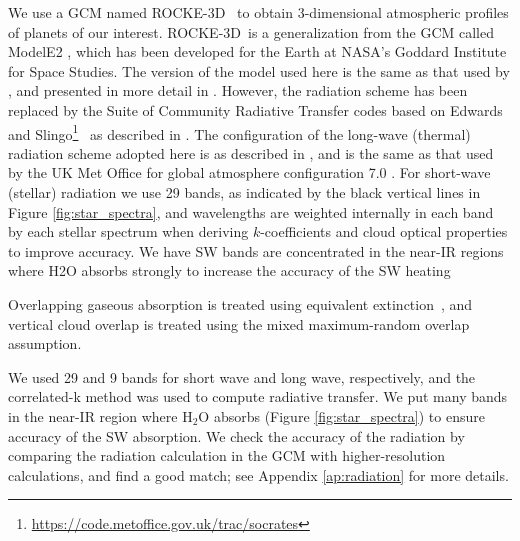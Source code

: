 \documentclass[11pt,numberedappendix,twocolappendix,]{emulateapj}
\def\water{H$_2$O }
\def\modelE{ROCKE-3D}
\begin{document}
We use a GCM named \modelE \ \citep{Way2017} to obtain 3-dimensional atmospheric profiles of planets of our interest. 
\modelE \ is a generalization from the GCM called ModelE2 \citep{Schmidt2014}, which has been developed for the Earth at NASA's Goddard Institute for Space Studies. 
%
The version of the model used here is the same as that used by \citet{Way2016}, and presented in more detail in \citet{Way2017}.
However, the radiation scheme has been replaced by the Suite of Community Radiative Transfer codes based on Edwards and Slingo\footnote{\url{https://code.metoffice.gov.uk/trac/socrates}}~\citep[SOCRATES,][]{EdwardsSlingo1996,Edwards1996} as described in \citet{Way2017}. 
The configuration of the long-wave (thermal) radiation scheme adopted here is as described in \citet{Way2017}, and is the same as that used by the UK Met Office for global atmosphere configuration 7.0 \citep[GA7.0][]{Walters2017}. 
For short-wave (stellar) radiation we use 29 bands, as indicated by the black vertical lines in Figure \ref{fig:star_spectra}, and wavelengths are weighted internally in each band by each stellar spectrum when deriving $k$-coefficients and cloud optical properties to improve accuracy. 
We have SW bands are concentrated in the near-IR regions where H2O absorbs strongly to increase the accuracy of the SW heating


Overlapping gaseous absorption is treated using equivalent extinction~\citep{Edwards1996,Amundsen2016}, and vertical cloud overlap is treated using the mixed maximum-random overlap assumption. 


We used 29 and 9 bands for short wave and long wave, respectively, and the correlated-k method was used to compute radiative transfer. 
We put many bands in the near-IR region where \water absorbs (Figure \ref{fig:star_spectra}) to ensure accuracy of the SW absorption. 
We check the accuracy of the radiation by comparing the radiation calculation in the GCM with higher-resolution calculations, and find a good match;  see Appendix \ref{ap:radiation} for more details. 
\end{document}
